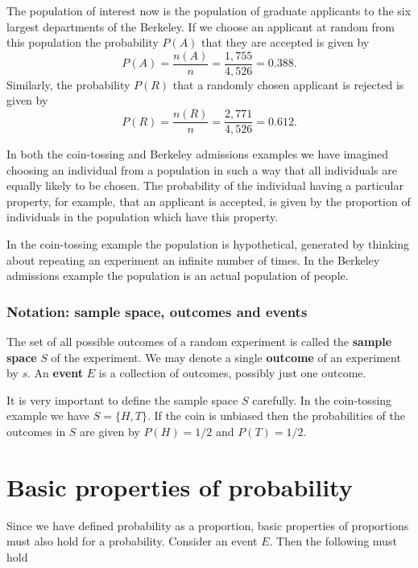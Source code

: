 \documentclass[
  british,
  11pt,
  openany, a4paper]{book}
\begin{document}
The population of interest now is the population of graduate applicants to the six largest departments of the Berkeley. If we choose an applicant at random from this population the probability \(P(A)\) that they are accepted is given by
\[ P(A) = \frac{n(A)}{n} = \frac{1,755}{4,526} = 0.388.\]
Similarly, the probability \(P(R)\) that a randomly chosen applicant is rejected is given by
\[ P(R) = \frac{n(R)}{n} = \frac{2,771}{4,526} = 0.612.\]

In both the coin-tossing and Berkeley admissions examples we have imagined choosing an individual from a population in such a way that all individuals are equally likely to be chosen. The probability of the individual having a particular property, for example, that an applicant is accepted, is given by the proportion of individuals in the population which have this property.

In the coin-tossing example the population is hypothetical, generated by thinking about repeating an experiment an infinite number of times. In the Berkeley admissions example the population is an actual population of people.

\subsubsection*{Notation: sample space, outcomes and events}\label{notation-sample-space-outcomes-and-events}

The set of all possible outcomes of a random experiment is called the \textbf{sample space} \(S\) of the experiment. We may denote a single \textbf{outcome} of an experiment by \(s\). An \textbf{event} \(E\) is a collection of outcomes, possibly just one outcome.

It is very important to define the sample space \(S\) carefully. In the coin-tossing example we have \(S=\{H,T\}\). If the coin is unbiased then the probabilities of the outcomes in \(S\) are given by \(P(H)=1/2\) and \(P(T)=1/2\).

\section{Basic properties of probability}\label{basic-properties-of-probability}

Since we have defined probability as a proportion, basic properties of proportions must also hold for a probability. Consider an event \(E\). Then the following must hold
\end{document}

